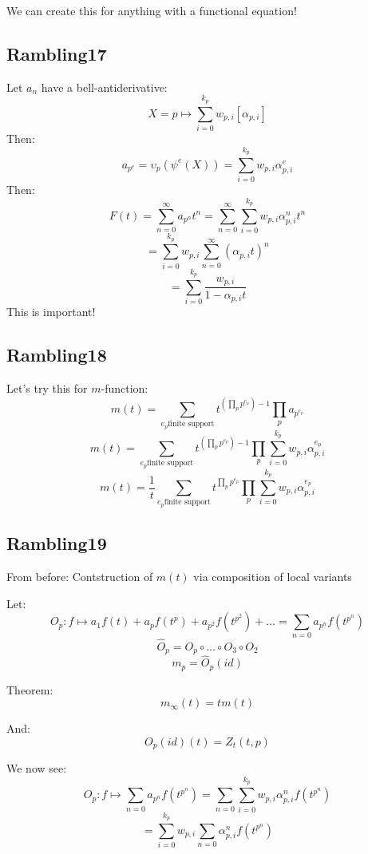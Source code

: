 \documentclass[a4paper]{amsart}
\begin{document}
We can create this for anything with a functional equation!


\subsection{Rambling17}
Let $a_n$ have a bell-antiderivative: 
$$X = p \mapsto \sum_{i = 0}^{k_p} w_{p, i}[\alpha_{p, i}]$$
Then:
$$a_{p^e} = \upsilon_p(\psi^e (X)) = \sum_{i = 0}^{k_p} w_{p, i}\alpha_{p, i}^e$$
Then: 
$$F(t) = \sum_{n = 0}^\infty a_{p^n}t^n = \sum_{n = 0}^\infty \sum_{i = 0}^{k_p} w_{p, i}\alpha_{p, i}^n t^n $$
$$ = \sum_{i = 0}^{k_p} w_{p, i} \sum_{n = 0}^\infty (\alpha_{p, i}t)^n $$
$$ = \sum_{i = 0}^{k_p} \frac{w_{p, i}}{1 - \alpha_{p, i}t} $$
This is important!


\subsection{Rambling18}
Let's try this for $m$-function: 
$$m(t) = \sum_{e_p \text{finite support}} t^{(\prod_p p^{e_p}) - 1} \prod_p a_{p^{e_p}}$$
$$m(t) = \sum_{e_p \text{finite support}} t^{(\prod_p p^{e_p}) - 1} \prod_p \sum_{i = 0}^{k_p} w_{p, i}\alpha_{p, i}^{e_p}$$
$$m(t) = \frac{1}{t}\sum_{e_p \text{finite support}} t^{\prod_p p^{e_p}} \prod_p \sum_{i = 0}^{k_p} w_{p, i}\alpha_{p, i}^{e_p}$$


\subsection{Rambling19}
From before:
Contstruction of $m(t)$ via composition of local variants 

Let:
$$O_p : f \mapsto a_1f(t) + a_pf(t^p) + a_{p^2}f(t^{p^2}) + \ldots = \sum_{n = 0} a_{p^n}f(t^{p^n})$$
$$\hat{O}_p = O_p \circ \ldots \circ O_3 \circ O_2$$
$$m_p = \hat{O}_p(id)$$

Theorem:
$$m_{\infty}(t) = t m(t)$$

And:
$$O_p(id)(t) = Z_t(t, p)$$

We now see:
$$O_p : f \mapsto \sum_{n = 0} a_{p^n}f(t^{p^n}) = \sum_{n = 0} \sum_{i = 0}^{k_p} w_{p, i}\alpha_{p, i}^nf(t^{p^n})$$
$$ = \sum_{i = 0}^{k_p} w_{p, i} \sum_{n = 0} \alpha_{p, i}^nf(t^{p^n})$$
\end{document}
